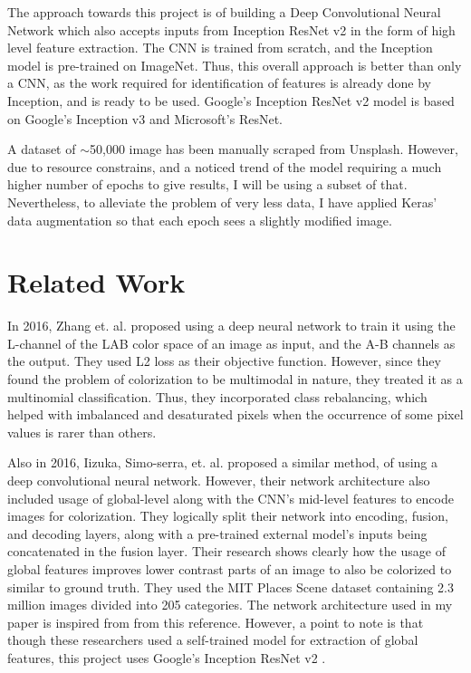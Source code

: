 \documentclass[10pt,twocolumn,letterpaper]{article}
\begin{document}
The approach towards this project is of building a Deep Convolutional Neural Network which also accepts inputs from Inception ResNet v2 in the form of high level feature extraction. The CNN is trained from scratch, and the Inception model is pre-trained on ImageNet. Thus, this overall approach is better than only a CNN, as the work required for identification of features is already done by Inception, and is ready to be used. Google's Inception ResNet v2 model is based on Google's Inception v3 and Microsoft's ResNet.

A dataset of $\sim$50,000 image has been manually scraped from Unsplash. However, due to resource constrains, and a noticed trend of the model requiring a much higher number of epochs to give results, I will be using a subset of that. Nevertheless, to alleviate the problem of very less data, I have applied Keras' data augmentation so that each epoch sees a slightly modified image.

\section{Related Work}
In 2016, Zhang et. al. \cite{Zhang1} proposed using a deep neural network to train it using the L-channel of the LAB color space \cite{LabColorSpace} of an image as input, and the A-B channels as the output. They used L2 loss as their objective function. However, since they found the problem of colorization to be multimodal in nature, they treated it as a multinomial classification. Thus, they incorporated class rebalancing, which helped with imbalanced and desaturated pixels when the occurrence of some pixel values is rarer than others.

Also in 2016, Iizuka, Simo-serra, et. al. \cite{Iizuka} proposed a similar method, of using a deep convolutional neural network. However, their network architecture also included usage of global-level along with the CNN's mid-level features to encode images for colorization. They logically split their network into encoding, fusion, and decoding layers, along with a pre-trained external model's inputs being concatenated in the fusion layer. Their research shows clearly how the usage of global features improves lower contrast parts of an image to also be colorized to similar to ground truth. They used the MIT Places Scene dataset containing 2.3 million images divided into 205 categories. The network architecture used in my paper is inspired from from this reference. However, a point to note is that though these researchers used a self-trained model for extraction of global features, this project uses Google's Inception ResNet v2 \cite{Inception}.
\end{document}
